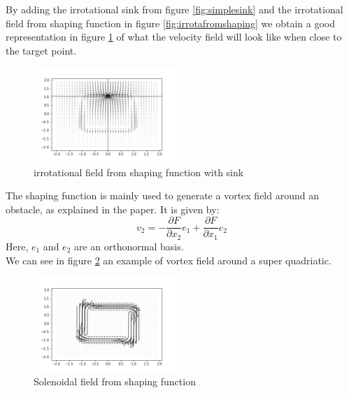 By adding the irrotational sink from figure \ref{fig:simplesink} and the irrotational field from shaping function in figure \ref{fig:irrotafromshaping} we obtain a good representation in figure \ref{fig:irrotafromshapingwithsink} of what the velocity field will look like when close to the target point. 
\begin{figure}[h!]
    \centering
    \includegraphics[width=0.48\textwidth]{Images/irrotashapingwithsink.png}
    \caption{irrotational field from shaping function with sink}
    \label{fig:irrotafromshapingwithsink}
\end{figure}

The shaping function is mainly used to generate a vortex field around an obstacle, as explained in the paper. It is given by: 
\begin{equation}
    v_2=-\frac{\partial{F}}{\partial{x_2}}e_1 + \frac{\partial{F}}{\partial{x_1}}e_2
\end{equation}
Here, $e_1$ and $e_2$ are an orthonormal basis. \\ 
We can see in figure \ref{fig:rotafromshaping} an example of vortex field around a super quadriatic.
\begin{figure}[h!]
    \centering
    \includegraphics[width=0.48\textwidth]{Images/rotafromshaping.png}
    \caption{Solenoidal field from shaping function}
    \label{fig:rotafromshaping}
\end{figure}

